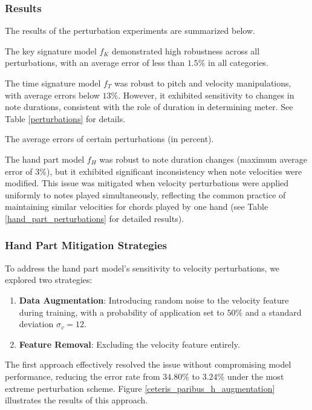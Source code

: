 \subsubsection{Results} \label{results}

The results of the perturbation experiments are summarized below.

The key signature model $f_K$ demonstrated high robustness across all perturbations, with an average error of less than $1.5\%$ in all categories.

The time signature model $f_T$ was robust to pitch and velocity manipulations, with average errors below $13\%$. However, it exhibited sensitivity to changes in note durations, consistent with the role of duration in determining meter. See Table \ref{perturbations} for details. 

\begin{table}[ht!]

\caption[The average errors of certain perturbations (in percent).]{The average errors of certain perturbations (in percent).}
\label{perturbations}
\end{table}

The hand part model $f_H$ was robust to note duration changes (maximum average error of $3\%$), but it exhibited significant inconsistency when note velocities were modified. This issue was mitigated when velocity perturbations were applied uniformly to notes played simultaneously, reflecting the common practice of maintaining similar velocities for chords played by one hand (see Table \ref{hand_part_perturbations} for detailed results).

\subsubsection{Hand Part Mitigation Strategies}

To address the hand part model’s sensitivity to velocity perturbations, we explored two strategies: \begin{enumerate} \item \textbf{Data Augmentation}: Introducing random noise to the velocity feature during training, with a probability of application set to $50\%$ and a standard deviation $\sigma_v = 12$. \item \textbf{Feature Removal}: Excluding the velocity feature entirely. \end{enumerate}

The first approach effectively resolved the issue without compromising model performance, reducing the error rate from $34.80\%$ to $3.24\%$ under the most extreme perturbation scheme. Figure \ref{ceteris_paribus_h_augmentation} illustrates the results of this approach.

